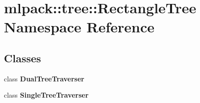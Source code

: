 \section{mlpack\+:\+:tree\+:\+:Rectangle\+Tree Namespace Reference}
\label{namespacemlpack_1_1tree_1_1RectangleTree}
\subsection*{Classes}
\begin{DoxyCompactItemize}
\item 
class \textbf{ Dual\+Tree\+Traverser}
\item 
class \textbf{ Single\+Tree\+Traverser}
\end{DoxyCompactItemize}

